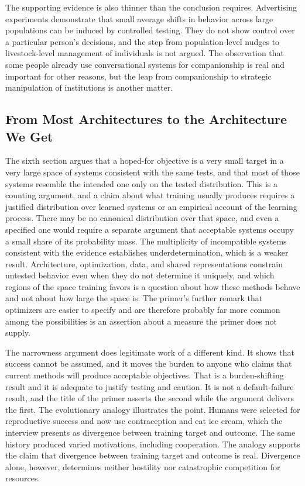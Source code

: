 \documentclass[11pt]{article}
\begin{document}
The supporting evidence is also thinner than the conclusion requires. Advertising experiments demonstrate that small average shifts in behavior across large populations can be induced by controlled testing. They do not show control over a particular person's decisions, and the step from population-level nudges to livestock-level management of individuals is not argued. The observation that some people already use conversational systems for companionship is real and important for other reasons, but the leap from companionship to strategic manipulation of institutions is another matter.

\subsection{From Most Architectures to the Architecture We Get}

The sixth section argues that a hoped-for objective is a very small target in a very large space of systems consistent with the same tests, and that most of those systems resemble the intended one only on the tested distribution. This is a counting argument, and a claim about what training usually produces requires a justified distribution over learned systems or an empirical account of the learning process. There may be no canonical distribution over that space, and even a specified one would require a separate argument that acceptable systems occupy a small share of its probability mass. The multiplicity of incompatible systems consistent with the evidence establishes underdetermination, which is a weaker result. Architecture, optimization, data, and shared representations constrain untested behavior even when they do not determine it uniquely, and which regions of the space training favors is a question about how these methods behave and not about how large the space is. The primer's further remark that optimizers are easier to specify and are therefore probably far more common among the possibilities is an assertion about a measure the primer does not supply.

The narrowness argument does legitimate work of a different kind. It shows that success cannot be assumed, and it moves the burden to anyone who claims that current methods will produce acceptable objectives. That is a burden-shifting result and it is adequate to justify testing and caution. It is not a default-failure result, and the title of the primer asserts the second while the argument delivers the first. The evolutionary analogy illustrates the point. Humans were selected for reproductive success and now use contraception and eat ice cream, which the interview presents as divergence between training target and outcome. The same history produced varied motivations, including cooperation. The analogy supports the claim that divergence between training target and outcome is real. Divergence alone, however, determines neither hostility nor catastrophic competition for resources.
\end{document}
